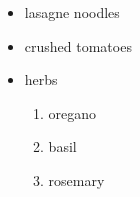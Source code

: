 \begin{itemize}
  \item lasagne noodles
  \item crushed tomatoes
  \item herbs \begin{enumerate}
    \item oregano
    \item basil
    \item rosemary
  \end{enumerate}
\end{itemize}
